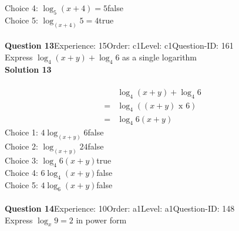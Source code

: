 \documentclass{article}
\begin{document}
Choice 4: \hspace{20pt}$\log_{5}(x+4)=5$\hspace{20pt}false\\
Choice 5: \hspace{20pt}$\log_{(x+4)}5=4$\hspace{20pt}true\\
\\[4pt]
\noindent\textbf{Question 13}\hspace{20pt}Experience: 15\hspace{20pt}Order: c1\hspace{20pt}Level: c1\hspace{20pt}Question-ID: 161\\[2pt]
Express $\log_{4}(x+y)+\log_{4}6$ as a single logarithm\\[4pt]
\noindent\textbf{Solution 13}\\[2pt]
\\[-35pt]\begin{align*}
&\log_{4}(x+y)+\log_{4}6\\[2pt]
=&\log_{4}((x+y) \,\, \text{x} \,\, 6)\\[2pt]
=&\log_{4}6(x+y)
\end{align*}
Choice 1: \hspace{20pt}$4\log_{(x+y)}6$\hspace{20pt}false\\
Choice 2: \hspace{20pt}$\log_{(x+y)}24$\hspace{20pt}false\\
Choice 3: \hspace{20pt}$\log_{4}6(x+y)$\hspace{20pt}true\\
Choice 4: \hspace{20pt}$6\log_{4}(x+y)$\hspace{20pt}false\\
Choice 5: \hspace{20pt}$4\log_{6}(x+y)$\hspace{20pt}false\\
\\[4pt]
\noindent\textbf{Question 14}\hspace{20pt}Experience: 10\hspace{20pt}Order: a1\hspace{20pt}Level: a1\hspace{20pt}Question-ID: 148\\[2pt]
Express $\log_x9=2$ in power form\\[4pt]
\end{document}
